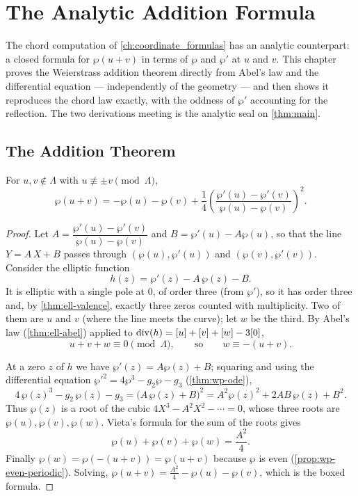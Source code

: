 \chapter{The Analytic Addition Formula}
\label{ch:analytic_addition}

The chord computation of \cref{ch:coordinate_formulas} has an analytic
counterpart: a closed formula for \(\wp(u+v)\) in terms of \(\wp\) and \(\wp'\) at
\(u\) and \(v\). This chapter proves the Weierstrass addition theorem directly
from Abel's law and the differential equation --- independently of the geometry ---
and then shows it reproduces the chord law exactly, with the oddness of \(\wp'\)
accounting for the reflection. The two derivations meeting is the analytic seal on
\cref{thm:main}.

\section{The Addition Theorem}
\label{sec:aa-theorem}

\begin{theorem}
\label{thm:aa-addition}
For \(u, v \notin \Lambda\) with \(u \not\equiv \pm v \pmod\Lambda\),
\[
  \boxed{\,\wp(u+v) = -\wp(u) - \wp(v)
  + \frac14\left( \frac{\wp'(u) - \wp'(v)}{\wp(u) - \wp(v)} \right)^2 .\,}
\]
\end{theorem}

\begin{proof}
Let \(A = \dfrac{\wp'(u) - \wp'(v)}{\wp(u) - \wp(v)}\) and \(B = \wp'(u) - A\wp(u)\),
so that the line \(Y = A\,X + B\) passes through \((\wp(u), \wp'(u))\) and
\((\wp(v), \wp'(v))\). Consider the elliptic function
\[
  h(z) = \wp'(z) - A\,\wp(z) - B .
\]
It is elliptic with a single pole at \(0\), of order three (from \(\wp'\)), so it
has order three and, by \cref{thm:ell-valence}, exactly three zeros counted with
multiplicity. Two of them are \(u\) and \(v\) (where the line meets the curve);
let \(w\) be the third. By Abel's law (\cref{thm:ell-abel}) applied to
\(\operatorname{div}(h) = [u] + [v] + [w] - 3[0]\),
\[
  u + v + w \equiv 0 \pmod\Lambda, \qquad\text{so}\qquad w \equiv -(u+v).
\]

At a zero \(z\) of \(h\) we have \(\wp'(z) = A\wp(z) + B\); squaring and using the
differential equation \(\wp'^2 = 4\wp^3 - g_2\wp - g_3\) (\cref{thm:wp-ode}),
\[
  4\,\wp(z)^3 - g_2\,\wp(z) - g_3 = \bigl(A\,\wp(z) + B\bigr)^2
  = A^2 \wp(z)^2 + 2AB\,\wp(z) + B^2 .
\]
Thus \(\wp(z)\) is a root of the cubic \(4X^3 - A^2 X^2 - \cdots = 0\), whose three
roots are \(\wp(u), \wp(v), \wp(w)\). Vieta's formula for the sum of the roots
gives
\[
  \wp(u) + \wp(v) + \wp(w) = \frac{A^2}{4} .
\]
Finally \(\wp(w) = \wp(-(u+v)) = \wp(u+v)\) because \(\wp\) is even
(\cref{prop:wp-even-periodic}). Solving,
\(\wp(u+v) = \tfrac{A^2}{4} - \wp(u) - \wp(v)\), which is the boxed formula.
\end{proof}

